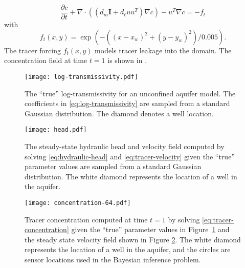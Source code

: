 \begin{equation}
    \frac{\partial c}{\partial t} + \nabla \cdot ((d_m \mathbf{I} + d_{\ell} u u^T) \nabla c) - u^T \nabla c = -f_t
    \label{eq:tracer-concentration}
\end{equation}
with  
\begin{equation}
    f_t(x,y) = \exp{(-((x-x_w)^2+(y-y_w)^2)/0.005)}.
\end{equation}
The tracer forcing $f_t(x,y)$ models tracer leakage into the domain. The concentration field at time $t = 1$ is shown in . 

\begin{figure}[h!]
\centering
    \texttt{[image: log-transmissivity.pdf]}
    \caption{The ``true'' log-transmissivity for an unconfined aquifer model. The coefficients in \eqref{eq:log-transmissivity} are sampled from a standard Gaussian distribution. The diamond denotes a well location.}
    \label{fig:tracer-transport-domain}
\end{figure}

\begin{figure}[h!]
\centering
    \texttt{[image: head.pdf]}
    \caption{The steady-state hydraulic head and velocity field computed by solving \eqref{eq:hydraulic-head} and \eqref{eq:tracer-velocity} given the ``true'' parameter values are sampled from a standard Gaussian distribution. The white diamond represents the location of a well in the aquifer.}
    \label{fig:tracer-transport-hydraulic-head}
\end{figure}

\begin{figure}[h!]
\centering
    \texttt{[image: concentration-64.pdf]}
    \caption{Tracer concentration computed at time $t=1$ by solving \eqref{eq:tracer-concentration} given the ``true'' parameter values in Figure~\ref{fig:tracer-transport-domain} and the steady state velocity field shown in Figure \ref{fig:tracer-transport-hydraulic-head}. The white diamond represents the location of a well in the aquifer, and the circles are sensor locations used in the Bayesian inference problem.}
    \label{fig:tracer-transport-concentration}
\end{figure}

